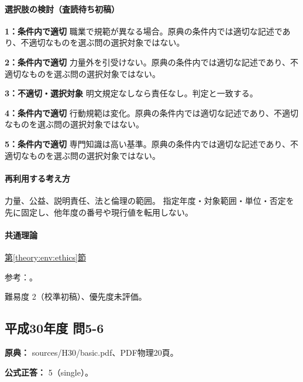 \paragraph{選択肢の検討（査読待ち初稿）}\mbox{}\par

\noindent\textbf{1：条件内で適切} 職業で規範が異なる場合。原典の条件内では適切な記述であり、不適切なものを選ぶ問の選択対象ではない。\par

\noindent\textbf{2：条件内で適切} 力量外を引受けない。原典の条件内では適切な記述であり、不適切なものを選ぶ問の選択対象ではない。\par

\noindent\textbf{3：不適切・選択対象} 明文規定なしなら責任なし。判定と一致する。\par

\noindent\textbf{4：条件内で適切} 行動規範は変化。原典の条件内では適切な記述であり、不適切なものを選ぶ問の選択対象ではない。\par

\noindent\textbf{5：条件内で適切} 専門知識は高い基準。原典の条件内では適切な記述であり、不適切なものを選ぶ問の選択対象ではない。\par

\paragraph{再利用する考え方} 力量、公益、説明責任、法と倫理の範囲。 指定年度・対象範囲・単位・否定を先に固定し、他年度の番号や現行値を転用しない。

\paragraph{共通理論} \hyperref[theory:env:ethics]{第\ref*{theory:env:ethics}節}

\par 参考：\cite{ipej_ethics2011}。

\par 難易度 2（校準初稿）、優先度未評価。

\subsection{平成30年度 問5-6}
\label{q:h30-reg-basic-5-6}

\noindent\textbf{原典：} sources/H30/basic.pdf、PDF物理20頁。

\textbf{公式正答：} 5（single）。

